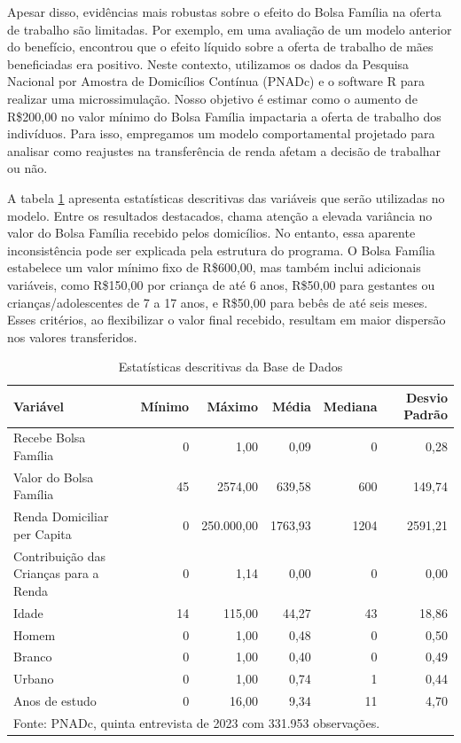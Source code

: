 \documentclass[12pt, a4paper, openany]{book}
\numberwithin{equation}{chapter}
\numberwithin{table}{chapter}
\numberwithin{figure}{chapter}
\theoremstyle{break}
\begin{document}
Apesar disso, evidências mais robustas sobre o efeito do Bolsa Família na oferta de trabalho são limitadas. Por exemplo, em uma avaliação de um modelo anterior do benefício, \textcite{tavares2010efeito} encontrou que o efeito líquido sobre a oferta de trabalho de mães beneficiadas era positivo. Neste contexto, utilizamos os dados da Pesquisa Nacional por Amostra de Domicílios Contínua (PNADc) e o software R para realizar uma microssimulação. Nosso objetivo é estimar como o aumento de R\$200,00 no valor mínimo do Bolsa Família impactaria a oferta de trabalho dos indivíduos. Para isso, empregamos um modelo comportamental projetado para analisar como reajustes na transferência de renda afetam a decisão de trabalhar ou não.

A tabela \ref{tab:descritivas-bf} apresenta estatísticas descritivas das variáveis que serão utilizadas no modelo. Entre os resultados destacados, chama atenção a elevada variância no valor do Bolsa Família recebido pelos domicílios. No entanto, essa aparente inconsistência pode ser explicada pela estrutura do programa. O Bolsa Família estabelece um valor mínimo fixo de R\$600,00, mas também inclui adicionais variáveis, como R\$150,00 por criança de até 6 anos, R\$50,00 para gestantes ou crianças/adolescentes de 7 a 17 anos, e R\$50,00 para bebês de até seis meses. Esses critérios, ao flexibilizar o valor final recebido, resultam em maior dispersão nos valores transferidos.

\begin{table}[H]
\centering
\caption{Estatísticas descritivas da Base de Dados}
\centering
\begin{tabular}[t]{lrrrrr}
\toprule
Variável & Mínimo & Máximo & Média & Mediana & Desvio Padrão\\
\midrule
Recebe Bolsa Família & 0 & 1,00 & 0,09 & 0 & 0,28\\
Valor do Bolsa Família & 45 & 2574,00 & 639,58 & 600 & 149,74\\
Renda Domiciliar per Capita & 0 & 250.000,00 & 1763,93 & 1204 & 2591,21\\
Contribuição das Crianças para a Renda & 0 & 1,14 & 0,00 & 0 & 0,00\\
Idade & 14 & 115,00 & 44,27 & 43 & 18,86\\
\addlinespace
Homem & 0 & 1,00 & 0,48 & 0 & 0,50\\
Branco & 0 & 1,00 & 0,40 & 0 & 0,49\\
Urbano & 0 & 1,00 & 0,74 & 1 & 0,44\\
Anos de estudo & 0 & 16,00 & 9,34 & 11 & 4,70\\
\bottomrule
\multicolumn{6}{l}{\footnotesize Fonte: PNADc, quinta entrevista de 2023 com 331.953 observações.}
\end{tabular}
\label{tab:descritivas-bf}
\end{table}
\end{document}

